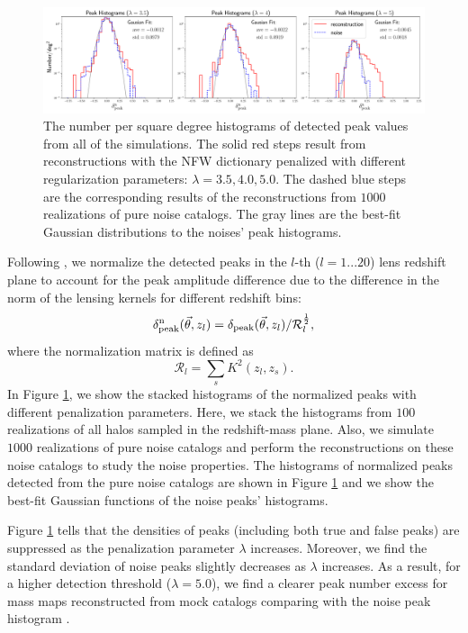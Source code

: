 \begin{figure}
 \centering
 \includegraphics[width=1.0\textwidth]{peak_histograms_NFW.pdf}
 \caption{The number per square degree histograms of detected peak values from
     all of the simulations.  The solid red steps result from reconstructions
     with the NFW dictionary penalized with different regularization
     parameters: $\lambda=3.5,4.0,5.0$. The dashed blue steps are the
     corresponding results of the reconstructions from $1000$ realizations of
     pure noise catalogs. The gray lines are the best-fit Gaussian distributions
     to the noises' peak histograms.
    }\label{fig_peakHist}
\end{figure}

Following \citet{WL-massMap-Glimpse2D-Lanusse2016}, we normalize the detected
peaks in the $l$-th ($l=1...20$) lens redshift plane to account for the peak
amplitude difference due to the difference in the norm of the lensing kernels
for different redshift bins:
\begin{equation}
\delta^{\rm{n}}_{\rm{peak}}(\vec{\theta},z_l)=\delta_{\rm{peak}}(\vec{\theta},z_l)/\mathcal{R}_{l}^{\frac{1}{2}},
\end{equation}
where the normalization matrix is defined as
\begin{equation}
\mathcal{R}_{l}=\sum_s K^2(z_l,z_s).
\end{equation}
In Figure \ref{fig_peakHist}, we show the stacked histograms of the
normalized peaks with different penalization parameters. Here, we stack the
histograms from $100$ realizations of all halos sampled in the redshift-mass
plane.
Also, we simulate $1000$ realizations of pure noise catalogs and perform the
reconstructions on these noise catalogs to study the noise properties.  The
histograms of normalized peaks detected from the pure noise catalogs are shown
in Figure \ref{fig_peakHist} and we show the best-fit Gaussian functions of the
noise peaks' histograms.

Figure \ref{fig_peakHist} tells that the densities of peaks (including both
true and false peaks) are suppressed as the penalization parameter $\lambda$
increases. Moreover, we find the standard deviation of noise peaks slightly
decreases as $\lambda$ increases. As a result, for a higher detection threshold
($\lambda=5.0$), we find a clearer peak number excess for mass maps
reconstructed from mock catalogs comparing with the noise peak histogram .

